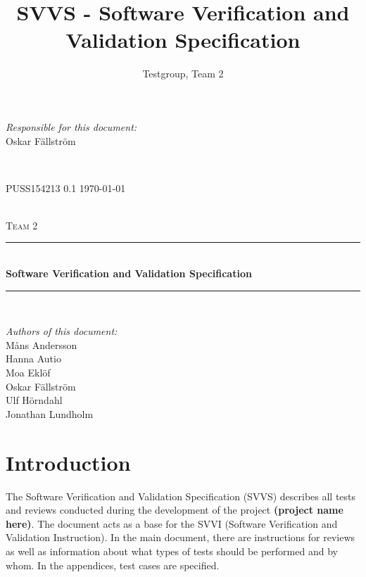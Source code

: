 \documentclass[a4paper]{article}
\title{SVVS - Software Verification and Validation Specification}
\author{Testgroup, Team 2}
\begin{document}
\begin{titlepage}
\newcommand{\HRule}{\rule{\linewidth}{0.5mm}}

\begin{minipage}{0.5\textwidth}
\begin{flushleft} %
\textit{Responsible for this document:}\\
Oskar Fällström %
\end{flushleft}
\end{minipage}
~
\begin{minipage}{0.4\textwidth}
\begin{flushright}
PUSS154213 0.1 %
\today
\end{flushright}
\end{minipage}\\[3cm]

\centering
\textsc{\LARGE Team 2}\\[0.5cm]

\HRule \\[0.4cm]
{ \huge \bfseries Software Verification and Validation Specification}\\[0.4cm] %
\HRule \\[1.5cm]

\vfill
\begin{flushleft}
\textit{Authors of this document:}\\
Måns Andersson \\
Hanna Autio \\
Moa Eklöf \\
Oskar Fällström \\
Ulf Hörndahl \\
Jonathan Lundholm
\end{flushleft}


\end{titlepage}
\setcounter{tocdepth}{2}
\tableofcontents
\newpage
{}

\section{Introduction}
The Software Verification and Validation Specification (SVVS) describes all tests and reviews conducted during the development of the project \textbf{(project name here)}. The document acts as a base for the SVVI (Software Verification and Validation Instruction).
In the main document, there are instructions for reviews as well as information about what types of tests should be performed and by whom. In the appendices, test cases are specified.
\end{document}
